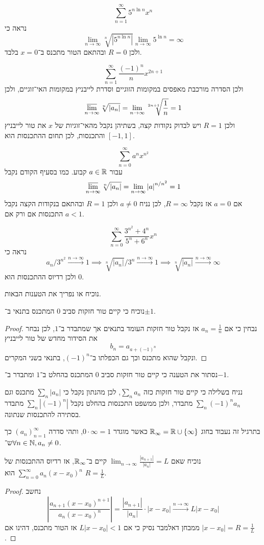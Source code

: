 \Subquestion{}
\[
	\sum_{n = 1}^{\infty} 5^{n \ln n} x^n
\]
נראה כי
\[
	\lim_{n \to \infty} \sqrt[n]{|5^{n \ln n}|}
	\lim_{n \to \infty} 5^{\ln n}
	= \infty
\]
ולכן $R = 0$ ובהתאם הטור מתכנס ב־$x = 0$ בלבד.

\Subquestion{}
\[
	\sum_{n = 1}^{\infty} \frac{{(-1)}^n}{n} x^{2n + 1}
\]
ולכן הסדרה מורכבת מאפסים במקומות הזוגיים וסדרת לייבניץ במקומות האי־זוגיים, ולכן
\[
	\operatorname*{\overline{lim}}_{n \to \infty} \sqrt[n]{|a_n|}
	= \lim_{n \to \infty} \sqrt[2n + 1]{\frac{1}{n}}
	= 1
\]
ולכן $R = 1$ ויש לבדוק נקודות קצה, בשתיהן נקבל מהאי־זוגיות של $x$ את טור לייבניץ והתכנסות, לכן תחום ההתכנסות הוא $[-1, 1]$.

\Subquestion{}
\[
	\sum_{n = 0}^{\infty} a^n x^{n^2}
\]
עבור $a \in \mathbb{R}$ קבוע.
כמו בסעיף הקודם נקבל
\[
	\operatorname*{\overline{lim}}_{n \to \infty} \sqrt[n]{|a_n|}
	= \lim_{n \to \infty} {|a|}^{n / n^2}
	= 1
\]
אם $a = 0$ אז נקבל $R = \infty$, לכן נניח $a \ne 0$ ולכן $R = 1$ ובהתאם בנקודות הקצה נקבל התכנסות אם ורק אם $a < 1$.

\Subquestion{}
\[
	\sum_{n = 0}^{\infty} \frac{3^{n^2} + 4^n}{5^n + 6^n} x^n
\]
נראה כי
\[
	a_n / 3^{n^2} \xrightarrow{n \to \infty} 1
	\implies \sqrt[n]{|a_n|} / 3^n \xrightarrow{n \to \infty} 1
	\implies \sqrt[n]{|a_n|} \xrightarrow{n \to \infty} \infty
\]
ולכן רדיוס ההתכנסות הוא $0$.

\Question{}
נוכיח או נפריך את הטענות הבאות.

\Subquestion{}
נוכיח כי קיים טור חזקות סביב $0$ המתכנס בתנאי ב־$\pm 1$.
\begin{proof}
	נבחין כי אם $a_n = \frac{1}{n}$ אז נקבל טור חזקות העומד בתנאים אך שמתבדר ב־$1$, לכן נבחר את הסידור מחדש של טור לייבניץ
	\[
		b_n = a_{a + {(-1)}^n}
	\]
	ונקבל שהוא מתכנס וכך גם הכפלתו ב־${(-1)}^n$, בתנאי בשני המקרים.
\end{proof}

\Subquestion{}
נסתור את הטענה כי קיים טור חזקות סביב $0$ המתכנס בהחלט ב־$1$ ומתבדר ב־$-1$.

נניח בשלילה כי קיים טור חזקות כזה $\sum_n a_n$, לכן מהנתון נקבל כי $\sum_n |a_n|$ מתכנס וגם $\sum_n {(-1)}^n a_n$ מתבדר, ולכן ממשפט התכנסות בהחלט נקבל $\sum_n |{(-1)}^n|$ מתבדר בסתירה להתכנסות שנתונה.

\Question{}
בתרגיל זה נעבוד בחוג $\mathbb{R}_\infty = \mathbb{R} \cup \{ \infty \}$ כאשר מוגדר $0 \cdot \infty = 1$, ותהי סדרה ${(a_n)}_{n = 1}^\infty$ כך ש־$\forall n \in \mathbb{N}, a_n \ne 0$.

\Subquestion{}
נוכיח שאם $\lim_{n \to \infty} \frac{|a_{n + 1}|}{|a_n|} = L$ קיים ב־$\mathbb{R}_\infty$, אז רדיוס ההתכנסות של $\sum_{n = 0}^{\infty} a_n {(x - x_0)}^n$ הוא $R = \frac{1}{L}$.
\begin{proof}
	נחשב
	\[
		\left\lvert \frac{a_{n + 1} {(x - x_0)}^{n + 1}}{a_n {(x - x_0)}^n} \right\rvert
		= \frac{|a_{n + 1}|}{|a_n|} \cdot |x - x_0|
		\xrightarrow{n \to \infty} L |x - x_0|
	\]
	ממבחן דאלמבר נסיק כי אם $L|x - x_0| < 1$ אז הטור מתכנס, דהינו אם $|x - x_0| = R = \frac{1}{L}$.
\end{proof}

